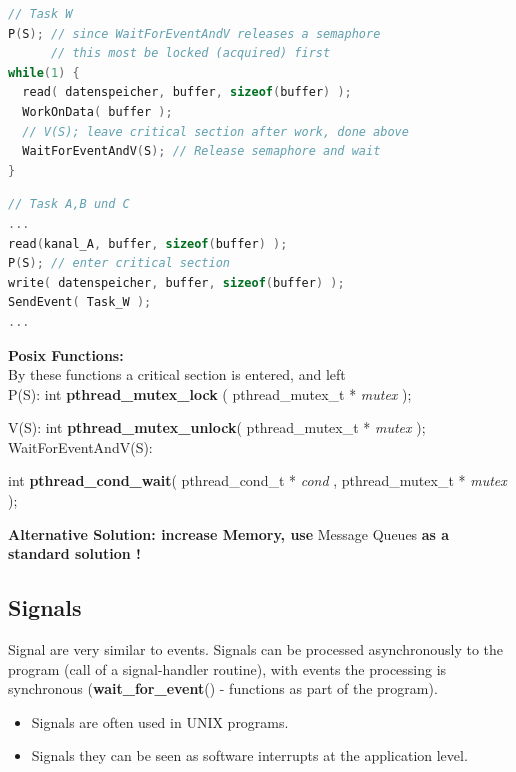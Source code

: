 \begin{lstlisting}[style=mystyle, language=c]
// Task W
P(S); // since WaitForEventAndV releases a semaphore
      // this most be locked (acquired) first
while(1) {
  read( datenspeicher, buffer, sizeof(buffer) );
  WorkOnData( buffer );
  // V(S); leave critical section after work, done above
  WaitForEventAndV(S); // Release semaphore and wait
}
\end{lstlisting}

\begin{lstlisting}[style=mystyle, language=c]
// Task A,B und C
...
read(kanal_A, buffer, sizeof(buffer) );
P(S); // enter critical section
write( datenspeicher, buffer, sizeof(buffer) );
SendEvent( Task_W );
...
\end{lstlisting}

\textbf{Posix Functions:}\\

By these functions a critical section is entered, and left\\

P(S):  int \textbf{pthread\_mutex\_lock }( pthread\_mutex\_t * \textit{mutex });

V(S):  int \textbf{pthread\_mutex\_unlock}( pthread\_mutex\_t * \textit{mutex });\\


WaitForEventAndV(S):

int \textbf{pthread\_cond\_wait}( pthread\_cond\_t * \textit{cond }, pthread\_mutex\_t * \textit{mutex });

\textbf{Alternative Solution: increase Memory, use }Message Queues \textbf{as a standard solution !}\\

\subsection{Signals}

Signal are very similar to events. Signals can be processed asynchronously to the program (call of a signal-handler routine), with events the processing is synchronous (\textbf{wait\_for\_event}() - functions as part of the program).

\begin{itemize}
\item Signals are often used in UNIX programs. 
\item Signals they can be seen as software interrupts at the application level.
\end{itemize}


